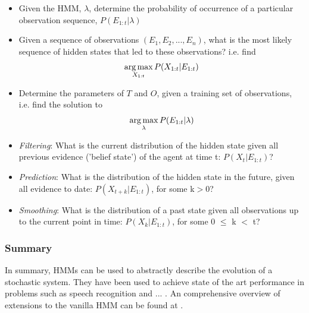 \begin{itemize}

    \item Given the HMM, $\lambda$, determine the probability of occurrence of a particular observation sequence, $P(E_{1:t} | \lambda)$
    
    \item Given a sequence of observations $(E_1, E_2, ..., E_n)$, what is the most likely sequence of hidden states that led to these observations? i.e. find \[\operatorname*{arg\,max}_{X_{1:t}} P(X_{1:t} | E_{1:t})\]
    
    \item Determine the parameters of $T$ and $O$, given a training set of observations, i.e. find the solution to \[\operatorname*{arg\,max}_{\lambda} P(E_{1:t} | \lambda)\]
    
    \item \textit{Filtering}: What is the current distribution of the hidden state given all previous evidence ('belief state') of the agent at time t: $P(X_t | E_{1:t})$?
    
    \item \textit{Prediction}: What is the distribution of the hidden state in the future, given all evidence to date: $P(X_{t+k} | E_{1:t})$, for some k$>$0?
    
    \item \textit{Smoothing}: What is the distribution of a past state given all observations up to the current point in time: $P(X_k | E_{1:t})$, for some 0 $\leq$ k $<$ t?
    
\end{itemize}
\par


\subsubsection{Summary}
In summary, HMMs can be used to abstractly describe the evolution of a stochastic system. They have been used to achieve state of the art performance in problems such as speech recognition \cite{ChiuSTATE-OF-THE-ARTMODELS} and ... . An comprehensive overview of extensions to the vanilla HMM can be found at \cite{Murphy1994DynamicLearning}.